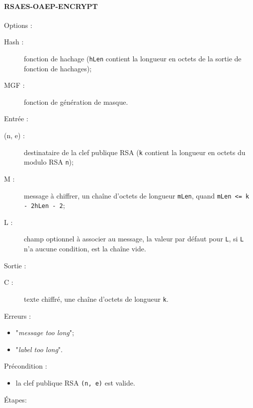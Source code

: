 \paragraph{RSAES-OAEP-ENCRYPT}
Options :
\begin{description}
\item [Hash :] fonction de hachage (\texttt{hLen} contient la longueur en octets de la sortie de fonction de hachages);
\item [MGF :] fonction de génération de masque.\\
\end{description}
Entrée :
\begin{description}
\item [(n, e) : ] destinataire de la clef publique RSA (\texttt{k} contient la longueur en octets du modulo RSA \texttt{n});
\item [M : ] message à chiffrer, un chaîne d'octets de longueur \texttt{mLen}, quand \texttt{mLen <= k - 2hLen - 2};
\item [L : ] champ optionnel à associer au message, la valeur par défaut pour \texttt{L}, si \texttt{L} n'a aucune condition, est la chaîne vide.\\
\end{description}
Sortie :
\begin{description}
\item [C : ] texte chiffré, une chaîne d'octets de longueur \texttt{k}.\\
\end{description}
Erreurs :
\begin{itemize}
\item "\textit{message too long}";
\item "\textit{label too long}".\\
\end{itemize}
Précondition :
\begin{itemize}
\item la clef publique RSA \texttt{(n, e)} est valide.\\
\end{itemize}
Étapes:
